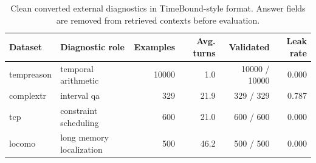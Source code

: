 \begin{table}[t]
\centering
\small
\begin{tabular}{llrrrr}
\toprule
Dataset & Diagnostic role & Examples & Avg. turns & Validated & Leak rate \\
\midrule
tempreason & temporal arithmetic & 10000 & 1.0 & 10000 / 10000 & 0.000 \\
complextr & interval qa & 329 & 21.9 & 329 / 329 & 0.787 \\
tcp & constraint scheduling & 600 & 21.0 & 600 / 600 & 0.000 \\
locomo & long memory localization & 500 & 46.2 & 500 / 500 & 0.000 \\
\bottomrule
\end{tabular}
\caption{Clean converted external diagnostics in TimeBound-style format. Answer fields are removed from retrieved contexts before evaluation.}
\label{tab:external_converted_clean_stats}
\end{table}
